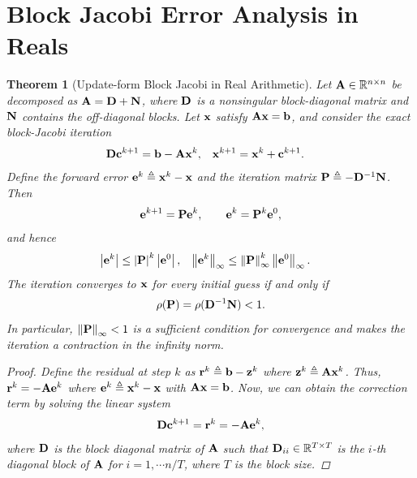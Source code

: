 \documentclass[11pt,draft]{article}
\newcommand{\define}{\ensuremath{\triangleq}}
\newcommand{\vect}[1]{\mathbf{\MakeLowercase{#1}}}
\newcommand{\mat}[1]{\mathbf{\MakeUppercase{#1}}}
\newcommand{\ireal}[1]{\in\mathbb{R}^{#1}}
\newcommand{\norm}[2][]{\left\|#2\right\|_{#1}}
\newtheorem{theorem}{Theorem}[section]
\theoremstyle{definition}
\theoremstyle{remark}
\newcommand{\abs}[1]{\left|#1\right|}
\begin{document}
\section{Block Jacobi Error Analysis in Reals}
\begin{theorem}[Update-form Block Jacobi in Real Arithmetic]
\label{theorem:block_jacobi_real}
Let $\mat{a}\ireal{n\times n}$ be decomposed as
$\mat{a}=\mat{d}+\mat{n}$, where $\mat{d}$ is a nonsingular block-diagonal
matrix and $\mat{n}$ contains the off-diagonal blocks. Let
$\vect{x}$ satisfy $\mat{a}\vect{x}=\vect{b}$, and consider the exact
block-Jacobi iteration
\begin{align}
    \mat{d}\vect{c}^{k+1}
    &=\vect{b}-\mat{a}\vect{x}^k,
    &
    \vect{x}^{k+1}
    &=\vect{x}^k+\vect{c}^{k+1}.
\end{align}
Define the forward error $\vect{e}^k\define\vect{x}^k-\vect{x}$ and the
iteration matrix $\mat{p}\define-\mat{d}^{-1}\mat{n}$. Then
\begin{align}
    \vect{e}^{k+1}=\mat{p}\vect{e}^k,
    \qquad
    \vect{e}^k=\mat{p}^k\vect{e}^0,
\end{align}
and hence
\begin{align}
    \abs{\vect{e}^k}
    &\leq \abs{\mat{p}}^k\abs{\vect{e}^0},
    &
    \norm[\infty]{\vect{e}^k}
    &\leq
    \norm[\infty]{\mat{p}}^k
    \norm[\infty]{\vect{e}^0}.
\end{align}
The iteration converges to $\vect{x}$ for every initial guess if and only
if
\begin{align}
    \rho(\mat{p})
    =\rho(\mat{d}^{-1}\mat{n})<1.
\end{align}
In particular, $\norm[\infty]{\mat{p}}<1$ is a sufficient condition for
convergence and makes the iteration a contraction in the infinity norm.
  \begin{proof}
      Define the residual at step $k$ as $\vect{r}^k\define \vect{b} - \vect{z}^k$ where $\vect{z}^k \define \mat{a} \vect{x}^k$.
      Thus, $\vect{r}^k = - \mat{a}\vect{e}^k$ where $\vect{e}^k\define \vect{x}^k - \vect{x}$ with $\mat{a}\vect{x} = \vect{b}$.
      Now, we can obtain the correction term by solving the linear system
      \begin{align}
          \mat{d}\vect{c}^{k + 1} = \vect{r}^{k} = -\mat{a}\vect{e}^{k},
      \end{align}
      where $\mat{d}$ is the block diagonal matrix of $\mat{a}$ such that $\mat{d}_{ii}\ireal{T\times T}$ is the $i$-th diagonal block of $\mat{a}$ for $i=1,\cdots n / T$, where $T$ is the block size.

\end{proof}
\end{theorem}
\end{document}
